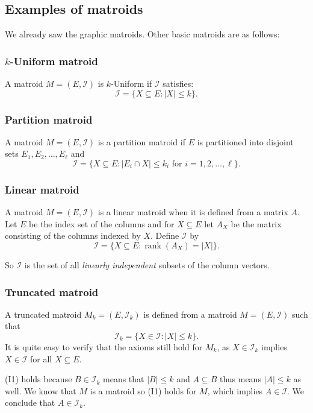 \subsection{Examples of matroids}\label{sec:examples}

We already saw the graphic matroids. Other basic matroids are as follows:

\subsubsection{$k$-Uniform matroid}

A matroid $M=(E,\mathcal{I})$ is $k$-Uniform if $\mathcal{I}$ satisfies:
\[
  \mathcal{I}=\{X\subseteq E: |X|\le k\}.
\]

\subsubsection{Partition matroid}

A matroid $M=(E,\mathcal{I})$ is a partition matroid if $E$ is partitioned into disjoint sets
$E_1,E_2,\ldots,E_\ell$ and
\[
  \mathcal{I}=\{X\subseteq E: |E_i\cap X|\le k_i \text{ for } i=1,2,\ldots,\ell\}.
\]

\subsubsection{Linear matroid}

A matroid $M=(E,\mathcal{I})$ is a linear matroid when it is defined from a matrix $A$. Let $E$ be
the index set of the columns and for $X\subseteq E$ let $A_X$ be the matrix consisting of the
columns indexed by $X$. Define $\mathcal{I}$ by
\[
  \mathcal{I}=\{X\subseteq E: \operatorname{rank}(A_X)=|X|\}.
\]

So $ \mathcal{I} $ is the set of all \textit{linearly independent} subsets of the column vectors.

\subsubsection{Truncated matroid}

A truncated matroid $M_k=(E,\mathcal{I}_k)$ is defined from a matroid $M=(E,\mathcal{I})$ such that
\[
  \mathcal{I}_k=\{X\in\mathcal{I}: |X|\le k\}.
\]
It is quite easy to verify that the axioms still hold for $M_k$, as $X\in\mathcal{I}_k$ implies
$X\in\mathcal{I}$ for all $X\subseteq E$.

(I1) holds because $B\in\mathcal{I}_k$ means that $|B|\le k$ and $A\subseteq B$ thus means
$|A|\le k$ as well. We know that $M$ is a matroid so (I1) holds for $M$, which implies
$A\in\mathcal{I}$. We conclude that $A\in\mathcal{I}_k$.

